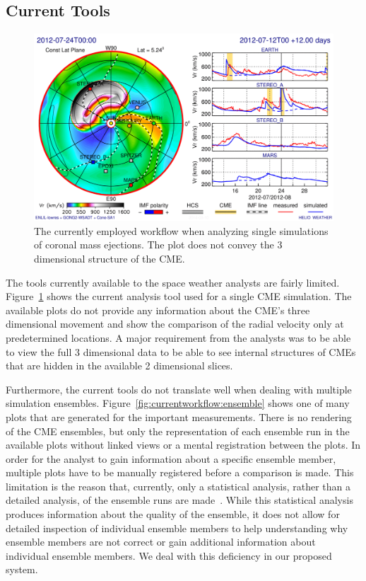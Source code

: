 \documentclass[journal]{vgtc}                %
\begin{document}
\subsection{Current Tools} \label{sec:currentworkflow}
\begin{figure}
\newcommand{\abImageWidth}{\columnwidth}
\centering
\includegraphics[width=\abImageWidth]{figures/current_workflow.png}
\caption{The currently employed workflow when analyzing single simulations of coronal mass ejections. The plot does not convey the 3 dimensional structure of the CME.}
\label{fig:currentworkflow:single}
\end{figure}

The tools currently available to the space weather analysts are fairly limited. Figure~\ref{fig:currentworkflow:single} shows the current analysis tool used for a single CME simulation. The available plots do not provide any information about the CME's three dimensional movement and show the comparison of the radial velocity only at predetermined locations. A major requirement from the analysts was to be able to view the full 3 dimensional data to be able to see internal structures of CMEs that are hidden in the available 2 dimensional slices.

Furthermore, the current tools do not translate well when dealing with multiple simulation ensembles. Figure~\ref{fig:currentworkflow:ensemble} shows one of many plots that are generated for the important measurements. There is no rendering of the CME ensembles, but only the representation of each ensemble run in the available plots without linked views or a mental registration between the plots. In order for the analyst to gain information about a specific ensemble member, multiple plots have to be manually registered before a comparison is made. This limitation is the reason that, currently, only a statistical analysis, rather than a detailed analysis, of the ensemble runs are made~\cite{mays2015ensemble}. While this statistical analysis produces information about the quality of the ensemble, it does not allow for detailed inspection of individual ensemble members to help understanding why ensemble members are not correct or gain additional information about individual ensemble members. We deal with this deficiency in our proposed system.
\end{document}
